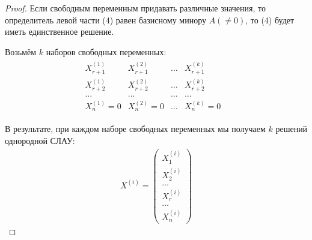\begin{proof}
  Если свободным переменным придавать различные значения, то определитель левой части (4) равен базисному минору $A (\neq 0)$, то (4) будет иметь единственное решение.

  Возьмём $k$ наборов свободных переменных:
   \begin{gather*}
    \begin{matrix}
      X^{(1)}_{r+1} & X^{(2)}_{r+1} & \ldots & X^{(k)}_{r+1} \\
      X^{(1)}_{r+2} & X^{(2)}_{r+2} & \ldots & X^{(k)}_{r+2} \\
      \ldots & \ldots & \ldots & \ldots \\
      X^{(1)}_n = 0 & X^{(2)}_n = 0 & \ldots & X^{(k)}_n = 0 & 
    \end{matrix}
  \end{gather*}

  В результате, при каждом наборе свободных переменных мы получаем $k$ решений однородной СЛАУ:
   \begin{gather*}
     X^{(i)} = 
     \begin{pmatrix}
       X^{(i)}_1 \\
       X^{(i)}_2 \\
       \ldots \\
       X^{(i)}_r \\
       \ldots \\
       X^{(i)}_n
     \end{pmatrix}
  \end{gather*}


\end{proof}
